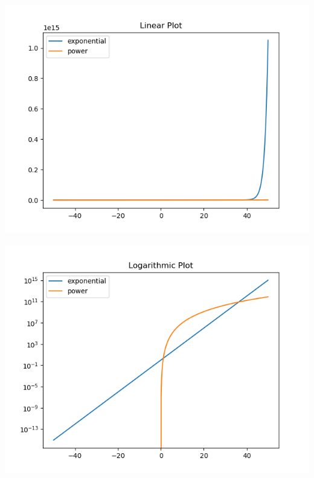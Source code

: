 \begin{frame}[fragile]
%
\begin{tcbraster}[raster columns=2,
                  raster equal height,
                  nobeforeafter,
                  raster column skip=0.5cm]
\begin{tcolorbox}[title=Linear Plot]
	\includegraphics[width=\linewidth]{./gfx/plt-linear}
\end{tcolorbox}
%
\begin{tcolorbox}[title=Logarithmic Plot]
	\includegraphics[width=\linewidth]{./gfx/plt-logarithmic}
\end{tcolorbox}
\end{tcbraster}
%
\end{frame}

